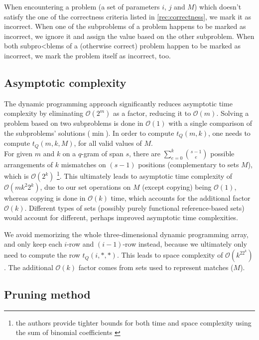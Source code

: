 \documentclass[paper=a4, fontsize=11pt]{scrartcl} %
\numberwithin{equation}{section} %
\numberwithin{figure}{section} %
\numberwithin{table}{section} %
\begin{document}
When encountering a problem (a set of parameters $i$, $j$ and $M$) which doesn't satisfy the one of the correctness criteria listed in \ref{rec:correctness}, we mark it as incorrect. When one of the subproblems of a problem happens to be marked as incorrect, we ignore it and assign the value based on the other subproblem. When both subpro<blems of a (otherwise correct) problem happen to be marked as incorrect, we mark the problem itself as incorrect, too. \\

\subsection{Asymptotic complexity}
\label{subsec:complexity}
The dynamic programming approach significantly reduces asymptotic time complexity by eliminating $\mathcal{O}(2^m)$ as a factor, reducing it to $\mathcal{O}(m)$.
Solving a problem based on two subproblems is done in $\mathcal{O}(1)$ with a single comparison of the subproblems' solutions ($\min$). 
In order to compute $t_Q(m, k)$, one needs to compute $t_Q(m, k, M)$, for all valid values of $M$. \\

For given $m$ and $k$ on a $q$-gram of span $s$, there are $\sum_{e = 0}^k {s - 1 \choose e}$ possible arrangements of $k$ mismatches on $(s - 1)$ positions (complementary to sets $M$), which is $\mathcal{O}(2^k)$ \footnote{the authors provide tighter bounds for both time and space complexity using the sum of binomial coefficients \cite{njihovPaper}}. This ultimately leads to asymptotic time complexity of $\mathcal{O}(mk^2 2^k)$, due to our set operations on $M$ (except copying) being $\mathcal{O}(1)$, whereas copying is done in $\mathcal{O}(k)$ time, which accounts for the additional factor $\mathcal{O}(k)$. Different types of sets (possibly purely functional reference-based sets) would account for different, perhaps improved asymptotic time complexities. 

We avoid memorizing the whole three-dimensional dynamic programming array, and only keep each $i$-row and $(i - 1)$-row instead, because we ultimately only need to compute the row $t_Q(i, *, *)$. This leads to space complexity of $\mathcal{O}(k^22^k)$. The additional $\mathcal{O}(k)$ factor comes from sets used to represent matches ($M$).  



\subsection{Pruning method}
\label{subsec:pruning}
\end{document}
